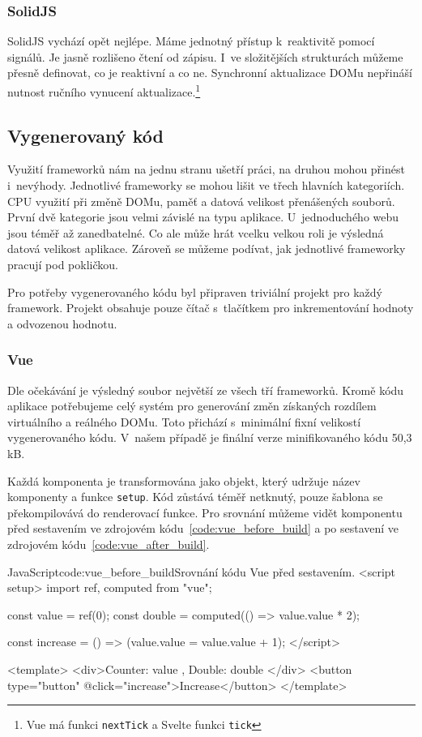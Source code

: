 \documentclass[
  master,
  program=ainf,
  printversion,
  tables=false,
  sourcecodes,
  glossaries,
  index
]{kidiplom}
\begin{document}
\subsubsection{SolidJS}
SolidJS vychází opět nejlépe. Máme jednotný přístup k~reaktivitě pomocí signálů. Je jasně rozlišeno čtení od zápisu.
I~ve složitějších strukturách můžeme přesně definovat, co je reaktivní a co ne. Synchronní aktualizace DOMu nepřináší
nutnost ručního vynucení aktualizace.\footnote{Vue má funkci {\tt nextTick} a Svelte funkci {\tt tick}}

\subsection{Vygenerovaný kód}

Využití frameworků nám na jednu stranu ušetří práci, na druhou mohou přinést i~nevýhody.
Jednotlivé frameworky se mohou lišit ve třech hlavních kategoriích. CPU využití při změně DOMu,
paměť a datová velikost přenášených souborů. První dvě kategorie jsou velmi závislé na typu aplikace.
U~jednoduchého webu jsou téměř až zanedbatelné. Co ale může hrát vcelku velkou roli je výsledná
datová velikost aplikace. Zároveň se můžeme podívat, jak jednotlivé frameworky pracují pod pokličkou. 

Pro potřeby vygenerovaného kódu byl připraven triviální projekt pro každý framework. 
Projekt obsahuje pouze čítač s~tlačítkem pro inkrementování hodnoty a odvozenou hodnotu. 

\subsubsection{Vue}
Dle očekávání je výsledný soubor největší ze všech tří frameworků. Kromě kódu aplikace potřebujeme celý systém
pro generování změn získaných rozdílem virtuálního a reálného DOMu. Toto přichází s~minimální fixní velikostí
vygenerovaného kódu. V~našem případě je finální verze minifikovaného kódu 50,3 kB.

Každá komponenta je transformována jako objekt, který udržuje název komponenty a funkce {\tt setup}.
Kód zůstává téměř netknutý, pouze šablona se překompilovává
do renderovací funkce. Pro srovnání můžeme vidět komponentu před sestavením ve zdrojovém kódu~\ref{code:vue_before_build} a
po sestavení ve zdrojovém kódu~\ref{code:vue_after_build}. 

  \begin{kicode}{JavaScript}{code:vue_before_build}{Srovnání kódu Vue před sestavením.}
    <script setup>
      import { ref, computed } from "vue";

      const value = ref(0);
      const double = computed(() => value.value * 2);

      const increase = () => (value.value = value.value + 1);
    </script>

    <template>
      <div>Counter: {{ value }}, Double: {{ double }}</div>
      <button type="button" @click="increase">Increase</button>
    </template>
\end{kicode}
\end{document}

